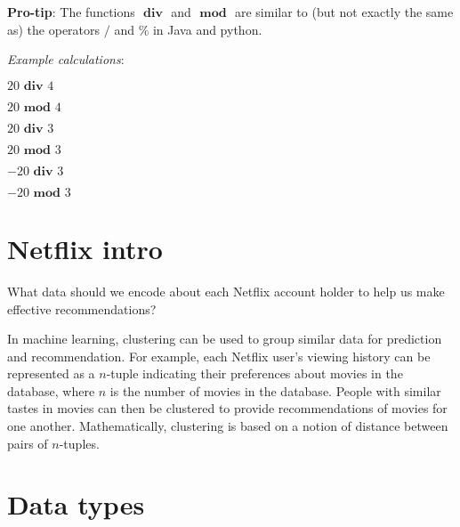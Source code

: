 \documentclass[12pt, oneside]{article}
\begin{document}
{\bf Pro-tip}: The functions $\textbf{ div }$ and $\textbf{ mod }$ are similar to (but not exactly the same as) 
the operators $/$ and $\%$ in Java and python.

\vfill

{\it Example calculations}:

$20 \textbf{ div } 4$

\vspace{20pt}

$20 \textbf{ mod } 4$

\vspace{20pt}

$20 \textbf{ div } 3$

\vspace{20pt}

$20 \textbf{ mod } 3$

\vspace{20pt}

$-20 \textbf{ div } 3$

\vspace{20pt}

$-20 \textbf{ mod } 3$

\vfill \vfill
\section*{Netflix intro}


What data should we encode about each Netflix account holder to help us make effective recommendations?

\vfill
\vfill

In machine learning, clustering can be used to group similar data for prediction and recommendation.  For example,
each Netflix user's viewing history can be represented as a $n$-tuple indicating their preferences about
movies in the database, where $n$ is the number of movies in the database.  People with similar tastes in movies can then be clustered to provide recommendations
of movies for one another.  Mathematically, clustering is based on a notion of distance between pairs of $n$-tuples.
 \vfill
\section*{Data types}
\end{document}
